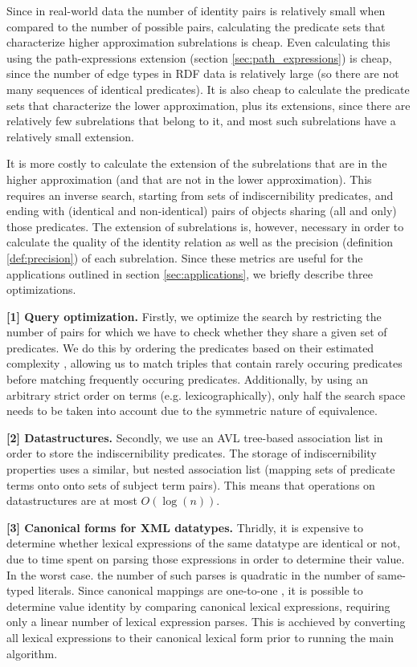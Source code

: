 Since in real-world data the number of identity pairs
  is relatively small when compared to the number of possible pairs,
  calculating the predicate sets that characterize higher approximation
  subrelations is cheap.
Even calculating this using the path-expressions extension
  (section \ref{sec:path_expressions})
  is cheap, since the number of edge types in RDF data is relatively large
  (so there are not many sequences of identical predicates).
It is also cheap to calculate the predicate sets that characterize
  the lower approximation, plus its extensions,
  since there are relatively few subrelations that belong to it,
  and most such subrelations have a relatively small extension.

It is more costly to calculate the extension of the subrelations that are
  in the higher approximation (and that are not in the lower approximation).
This requires an inverse search, starting from sets of
  indiscernibility predicates, and ending with (identical and non-identical)
  pairs of objects sharing (all and only) those predicates.
The extension of subrelations is, however, necessary in order to
  calculate the quality of the identity relation
  as well as the precision (definition \ref{def:precision})
  of each subrelation.
Since these metrics are useful for the applications outlined
  in section \ref{sec:applications},
  we briefly describe three optimizations.

\textbf{[1] Query optimization.}
Firstly, we optimize the search by restricting the number of pairs
  for which we have to check whether they share a given set of predicates.
We do this by ordering the predicates based on their
  estimated complexity \cite{Wielemaker2005},
  allowing us to match triples that contain rarely occuring predicates
  before matching frequently occuring predicates.
Additionally, by using an arbitrary strict order on terms
  (e.g. lexicographically),
  only half the search space needs to be taken into account
  due to the symmetric nature of equivalence.

\textbf{[2] Datastructures.}
Secondly, we use an AVL tree-based association list
  in order to store the indiscernibility predicates.
The storage of indiscernibility properties uses a similar, but nested
  association list (mapping sets of predicate terms onto
  onto sets of subject term pairs).
This means that operations on datastructures are at most $O(\log(n))$.

\textbf{[3] Canonical forms for XML datatypes.}
Thridly, it is expensive to determine whether lexical expressions
  of the same datatype are identical or not,
  due to time spent on parsing those expressions
  in order to determine their value.
In the worst case. the number of such parses is quadratic
  in the number of same-typed literals.
Since canonical mappings are one-to-one \cite{XmlSchema2012},
  it is possible to determine value identity by comparing
  canonical lexical expressions,
  requiring only a linear number of lexical expression parses.
This is acchieved by converting all lexical expressions
  to their canonical lexical form prior to running the main algorithm.

